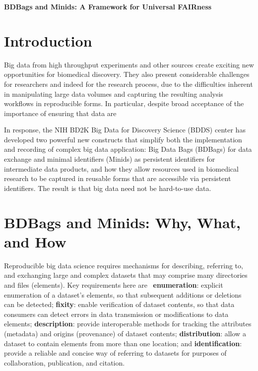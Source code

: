 \documentclass[11pt]{article}
\begin{document}
\noindent \textbf{ \Large BDBags and Minids: A Framework for Universal FAIRness }\\


\section{Introduction}

Big data from high throughput experiments and other sources create exciting new opportunities for biomedical discovery. 
They also present considerable challenges for researchers and indeed for the research process, 
due to the difficulties inherent in manipulating large data volumes and capturing the resulting analysis workflows in reproducible forms.
In particular, despite broad acceptance of the importance of ensuring that data are



In response, the NIH BD2K Big Data for Discovery Science (BDDS) center 
has developed two powerful new constructs that simplify both the implementation and recording of 
complex big data application: Big Data Bags (BDBags) for data exchange and 
minimal identifiers (Minids) as persistent identifiers for intermediate data products,
and how they allow resources used in biomedical research to be captured in reusable forms that are accessible via persistent identifiers. 
The result is that big data need not be hard-to-use data. 

\section{BDBags and Minids: Why, What, and How}

Reproducible big data science requires mechanisms for describing, referring to, and exchanging large  and complex datasets that may comprise many directories and files (elements).
Key requirements here are~\cite{chard16} 
\textbf{enumeration}: explicit enumeration of a dataset's elements, so that
subsequent additions or deletions can be detected; 
\textbf{fixity}: enable verification of dataset contents, so that data consumers can detect errors in data transmission or modifications to data elements; 
\textbf{description}: provide interoperable methods for tracking the attributes (metadata) and origins (provenance) of dataset contents; 
\textbf{distribution}: allow a dataset to contain elements from more than one location; and
\textbf{identification}: provide a reliable and concise way of referring to datasets for purposes of collaboration, publication, and citation.
\end{document}

